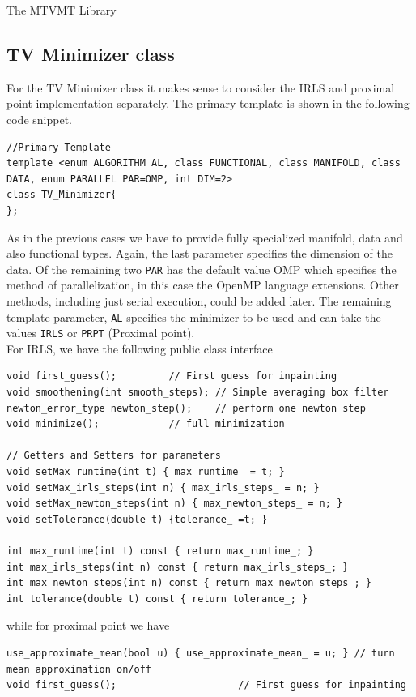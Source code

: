 \begin{chapter}{The MTVMT Library}
\subsection{TV Minimizer class} %
\label{sub:TVMinimizer class}
For the TV Minimizer class it makes sense to consider the IRLS and proximal point implementation separately. The primary template is shown in the following code snippet.
\cppinline
\begin{lstlisting}
//Primary Template 
template <enum ALGORITHM AL, class FUNCTIONAL, class MANIFOLD, class DATA, enum PARALLEL PAR=OMP, int DIM=2>
class TV_Minimizer{ 
};
\end{lstlisting}
As in the previous cases we have to provide fully specialized manifold, data and also functional types. Again, the last parameter specifies the dimension of the data. Of the
remaining two \texttt{PAR} has the default value OMP which specifies the method of parallelization, in this case the OpenMP language extensions. Other methods, including just serial
execution, could be added later. The remaining template parameter, \texttt{AL} specifies the minimizer to be used and can take the values \texttt{IRLS} or \texttt{PRPT} (Proximal point).\\

For IRLS, we have the following public class interface\\
\cppinline
\begin{lstlisting}
void first_guess();		    // First guess for inpainting
void smoothening(int smooth_steps); // Simple averaging box filter
newton_error_type newton_step();    // perform one newton step
void minimize();		    // full minimization

// Getters and Setters for parameters
void setMax_runtime(int t) { max_runtime_ = t; }
void setMax_irls_steps(int n) { max_irls_steps_ = n; }
void setMax_newton_steps(int n) { max_newton_steps_ = n; }
void setTolerance(double t) {tolerance_ =t; }
	    
int max_runtime(int t) const { return max_runtime_; }
int max_irls_steps(int n) const { return max_irls_steps_; }
int max_newton_steps(int n) const { return max_newton_steps_; }
int tolerance(double t) const { return tolerance_; }
\end{lstlisting}

while for proximal point we have\\
\cppinline
\begin{lstlisting}
use_approximate_mean(bool u) { use_approximate_mean_ = u; } // turn mean approximation on/off
void first_guess();					    // First guess for inpainting
 

\end{lstlisting}
\end{chapter}
